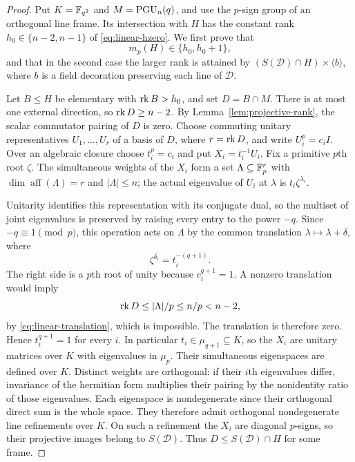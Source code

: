 \begin{proof}
Put $K=\mathbb F_{q^2}$ and $M=\operatorname{PGU}_n(q)$, and use the $p$-sign group of
an orthogonal line frame.  Its intersection with $H$ has the constant
rank $h_0\in\{n-2,n-1\}$ of \eqref{eq:linear-hzero}.
We first prove that
\begin{equation}\label{eq:unitary-rank-dichotomy}
 m_p(H)\in\{h_0,h_0+1\},
\end{equation}
and that in the second case the larger rank is attained by
$(S(\mathcal D)\cap H)\times\langle b\rangle$, where $b$ is a
field decoration preserving each line of $\mathcal D$.

Let $B\le H$ be elementary with $\operatorname{rk} B>h_0$, and set $D=B\cap M$.
There is at most one external direction, so $\operatorname{rk} D\ge n-2$.
By Lemma~\ref{lem:projective-rank}, the scalar commutator pairing of
$D$ is zero.  Choose commuting unitary representatives $U_1,\ldots,U_r$
of a basis of $D$, where $r=\operatorname{rk} D$, and write $U_i^p=c_iI$.
Over an algebraic closure choose $t_i^p=c_i$ and put $X_i=t_i^{-1}U_i$.
Fix a primitive $p$th root $\zeta$.  The simultaneous weights of the
$X_i$ form a set $\Lambda\subseteq\mathbb F_p^r$ with
$\dim\operatorname{aff}(\Lambda)=r$ and $|\Lambda|\le n$; the actual
eigenvalue of $U_i$ at $\lambda$ is $t_i\zeta^{\lambda_i}$.

Unitarity identifies this representation with its conjugate dual, so
the multiset of joint eigenvalues is preserved by raising every entry
to the power $-q$.  Since $-q\equiv1\pmod p$, this operation acts on
$\Lambda$ by the common translation $\lambda\mapsto\lambda+\delta$,
where
\[
 \zeta^{\delta_i}=t_i^{-(q+1)}.
\]
The right side is a $p$th root of unity because $c_i^{q+1}=1$.
A nonzero translation would imply
\[
 \operatorname{rk} D\le |\Lambda|/p\le n/p<n-2,
\]
by \eqref{eq:linear-translation}, which is impossible.  The translation
is therefore zero.  Hence $t_i^{q+1}=1$ for every $i$.  In particular
$t_i\in\mu_{q+1}\subseteq K$, so the $X_i$ are unitary matrices over
$K$ with eigenvalues in $\mu_p$.  Their simultaneous eigenspaces are
defined over $K$.  Distinct weights are orthogonal: if their $i$th
eigenvalues differ, invariance of the hermitian form multiplies their
pairing by the nonidentity ratio of those eigenvalues.  Each eigenspace
is nondegenerate since their orthogonal direct sum is the whole space.
They therefore admit orthogonal nondegenerate line refinements over $K$.
On such a refinement the $X_i$ are diagonal $p$-signs, so their
projective images belong to $S(\mathcal D)$.
Thus $D\le S(\mathcal D)\cap H$ for some frame.


\end{proof}
